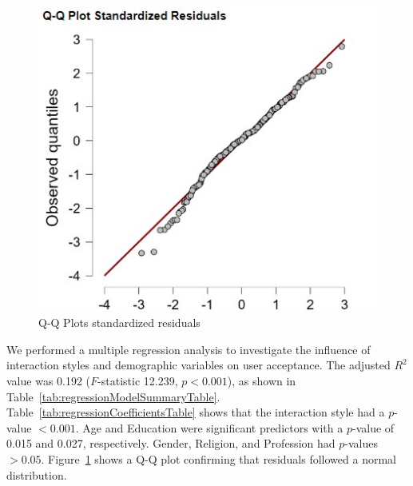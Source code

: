 \documentclass[conference]{IEEEtran}
\begin{document}
\begin{figure}[ht]
    \centering
    \includegraphics[width=\linewidth]{images/Q-Q Plots for residuals.jpg}
    \caption{Q-Q Plots standardized residuals}
    \label{q_qplots}    
\end{figure}

We performed a multiple regression analysis to investigate the influence of interaction styles and demographic variables on user acceptance. The adjusted $R^2$ value was 0.192 ($F$-statistic 12.239, $p < 0.001$), as shown in Table~\ref{tab:regressionModelSummaryTable}. Table~\ref{tab:regressionCoefficientsTable} shows that the interaction style had a $p$-value $< 0.001$. Age and Education were significant predictors with a $p$-value of 0.015 and 0.027, respectively. Gender, Religion, and Profession had $p$-values $> 0.05$. Figure~\ref{q_qplots} shows a Q-Q plot confirming that residuals followed a normal distribution.
\end{document}
